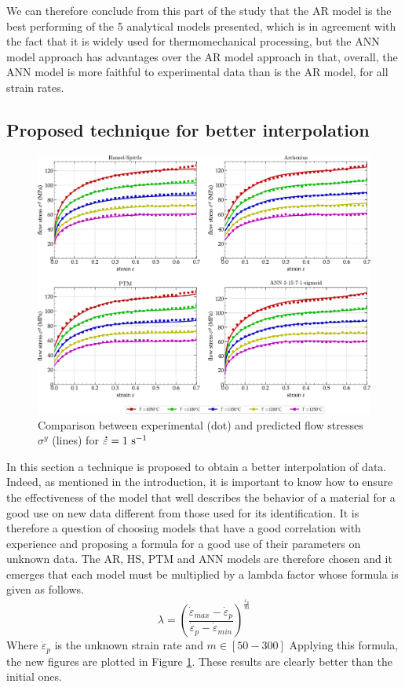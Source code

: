 \documentclass[twoside,english,1p,final,sort&compress]{elsarticle}
\theoremstyle{plain}
\DeclareRobustCommand{\mdot}[1]{\accentset{\mbox{\bfseries .}}{#1}}
\DeclareRobustCommand{\ps}{\text{s}^{-1}}
\begin{document}
We can therefore conclude from this part of the study that the AR model is the best performing of the 5 analytical models presented, which is in agreement with the fact that it is widely used for thermomechanical processing, but the ANN model approach has advantages over the AR model approach in that, overall, the ANN model is more faithful to experimental data than is the AR model, for all strain rates.

\subsection{Proposed technique for better interpolation}
\begin{figure}[!ht]
\centering
\includegraphics[width=\columnwidth]
{Figures/Performance}
\caption{Comparison between experimental (dot) and predicted flow stresses $\sigma^y$ (lines) for $\mdot\varepsilon=1~\ps$}
\label{fig:Performance}
\end{figure}
In this section a technique is proposed to obtain a better interpolation of data. Indeed, as mentioned in the introduction, it is important to know how to ensure the effectiveness of the model that well describes the behavior of a material for a good use on new data different from those used for its identification. It is therefore a question of choosing models that have a good correlation with experience and proposing a formula for a good use of their parameters on unknown data. The AR, HS, PTM and ANN models are therefore chosen and it emerges that each model must be multiplied by a lambda factor whose formula is given as follows.
\begin{equation}
 \lambda = \left(\frac{\dot{\varepsilon}_{max} - \dot{\varepsilon}_{p} }{\dot{\varepsilon}_{p} - \dot{\varepsilon}_{min}}\right)^{\frac{\dot{\varepsilon}_p}{m}}
\end{equation}
Where $\dot{\varepsilon}_{p}$ is the unknown strain rate and $m\in[50-300]$
Applying this formula, the new figures are plotted in Figure \ref{fig:Performance}. These results are clearly better than the initial ones. 
\end{document}
